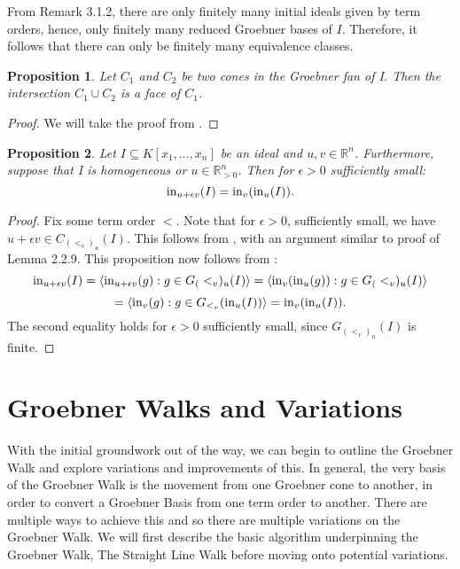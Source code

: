 \documentclass[12pt,a4paper]{report}
\newtheorem{proposition}{Proposition}
\begin{document}
From Remark 3.1.2, there are only finitely many initial ideals given by term orders, hence, only finitely many reduced Groebner bases of $I$. Therefore, it follows that there can only be finitely many equivalence classes.

\begin{proposition}
Let $C_{1}$ and $C_{2}$ be two cones in the Groebner fan of I. Then the intersection $C_{1} \cup C_{2}$ is a face of $C_{1}$.
\end{proposition}

\begin{proof}
We will take the proof from \cite[Proposition 3.1.18]{AndersPHD}.
\end{proof}

\begin{proposition}
Let $I \subseteq K[x_{1}, \ldots, x_{n}]$ be an ideal and $u, v \in \mathbb{R}^{n}$. Furthermore, suppose that I is homogeneous or $u \in \mathbb{R}_{> 0} ^{n}$. Then for $\epsilon > 0$ sufficiently small:
\begin{equation*}
    \operatorname{in}_{u+ \epsilon v} (I) = \operatorname{in}_{v} (\operatorname{in}_{u} (I)).
\end{equation*}
\end{proposition}

\begin{proof}
Fix some term order $<$. Note that for $\epsilon > 0$, sufficiently small, we have $u + \epsilon v \in C_({{<}_{v}})_{u} (I)$. This follows from \cite[Corollary 3.1.10]{AndersPHD}, with an argument similar to proof of Lemma 2.2.9. This proposition now follows from \cite[Corollary 3.1.13]{AndersPHD}:
\begin{equation*}
    \operatorname{in}_{u + \epsilon v} (I) = \langle \operatorname{in}_{u + \epsilon v} (g): g \in G_(<_{v})_{u} (I) \rangle = \langle \operatorname{in}_{v} (\operatorname{in}_{u} (g)): g \in G_(<_{v})_{u} (I) \rangle
\end{equation*}
\begin{equation*}
    = \langle \operatorname{in}_{v} (g): g \in G_{{<}_{v}} (\operatorname{in}_{u} (I)) \rangle = \operatorname{in}_{v} (\operatorname{in}_{u} (I)).
\end{equation*}
The second equality holds for $\epsilon > 0$ sufficiently small, since $G_(<_{v})_{u} (I)$ is finite.
\end{proof}


\chapter{Groebner Walks and Variations}
With the initial groundwork out of the way, we can begin to outline the Groebner Walk and explore variations and improvements of this. In general, the very basis of the Groebner Walk is the movement from one Groebner cone to another, in order to convert a Groebner Basis from one term order to another. There are multiple ways to achieve this and so there are multiple variations on the Groebner Walk. We will first describe the basic algorithm underpinning the Groebner Walk, The Straight Line Walk before moving onto potential variations. 
\end{document}

